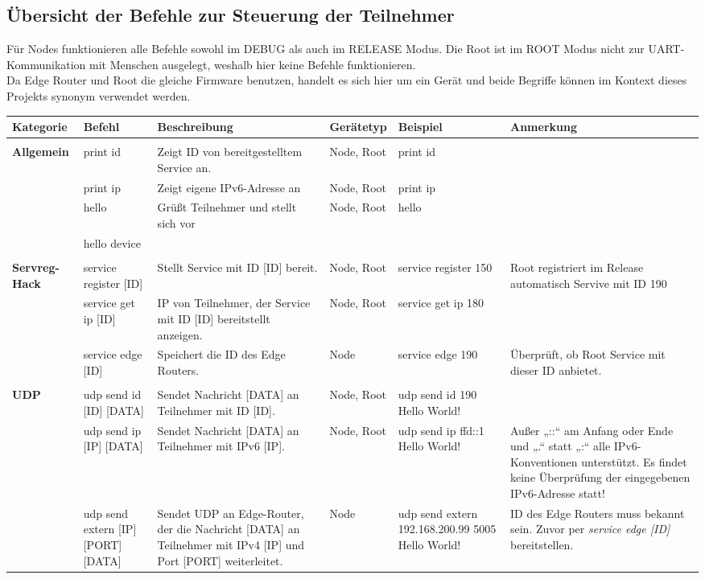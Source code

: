 \subsection{Übersicht der Befehle zur Steuerung der Teilnehmer}
Für Nodes funktionieren alle Befehle sowohl im DEBUG als auch im RELEASE Modus. Die Root ist im ROOT Modus nicht zur UART-Kommunikation mit Menschen ausgelegt, weshalb hier keine Befehle funktionieren. \\
Da Edge Router und Root die gleiche Firmware benutzen, handelt es sich hier um ein Gerät und beide Begriffe können im Kontext dieses Projekts synonym verwendet werden. \\
\begin{longtable}{l|p{4cm}|p{4cm}|p{2cm}|p{4cm}|p{4cm}}
	\textbf{Kategorie} & \textbf{Befehl} & \textbf{Beschreibung} & \textbf{Gerätetyp} & \textbf{Beispiel} & \textbf{Anmerkung} \\
	\toprule[1.5pt] &&&&&\\
	\textbf{Allgemein} & print id & Zeigt ID von bereitgestelltem Service an. & Node, Root & print id & \\
	\midrule
	& print ip & Zeigt eigene IPv6-Adresse an & Node, Root  & print ip \\
	\midrule
	& hello & Grüßt Teilnehmer und stellt sich vor & Node, Root & hello \\
	& hello device &&&&\\
	\bottomrule[1.5pt] &&&&&\\
	\textbf{Servreg-Hack} & service register [ID] & Stellt Service mit ID [ID] bereit. & Node, Root & service register 150
	& Root registriert im Release automatisch Servive mit ID 190 \\
	\midrule
	& service get ip [ID] & IP von Teilnehmer, der Service mit ID [ID] bereitstellt anzeigen.
	& Node, Root & service get ip 180 \\
	\midrule
	& service edge [ID] & Speichert die ID des Edge Routers. & Node & service edge 190 & Überprüft, ob Root Service mit dieser ID anbietet. \\
	\bottomrule[1.5pt] &&&&&\\
	\textbf{UDP} & udp send id [ID] [DATA] & Sendet Nachricht [DATA] an Teilnehmer mit ID [ID]. & Node, Root & udp send id 190 Hello World! \\
	\midrule
	& udp send ip [IP] [DATA] & Sendet Nachricht [DATA] an Teilnehmer mit IPv6 [IP]. & Node, Root & udp send ip ffd::1 Hello World! & Außer „::“ am Anfang oder Ende und „.“ statt „:“ alle IPv6-Konventionen unterstützt. Es findet keine Überprüfung der eingegebenen IPv6-Adresse statt! \\
	\midrule
	& udp send extern [IP] [PORT] [DATA] & Sendet UDP an Edge-Router, der die Nachricht [DATA] an Teilnehmer mit IPv4 [IP] und Port [PORT] weiterleitet. & Node & udp send extern 192.168.200.99 5005 Hello World! & ID des Edge Routers muss bekannt sein. Zuvor per \emph{service edge [ID]} bereitstellen. \\
	\bottomrule[1.5pt]
	
	
	
	
	
\end{longtable}